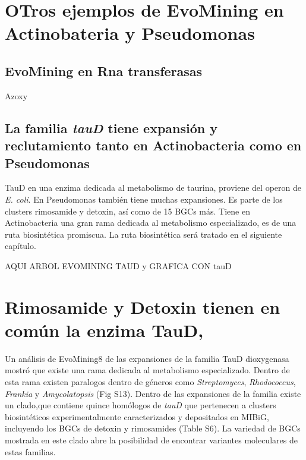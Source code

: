\documentclass[12pt,twoside]{reedthesis}
\begin{document}
  \section{OTros ejemplos de EvoMining en Actinobateria y
  Pseudomonas}\label{otros-ejemplos-de-evomining-en-actinobateria-y-pseudomonas}
  
  \subsection{EvoMining en Rna
  transferasas}\label{evomining-en-rna-transferasas}
  
  Azoxy
  
  \subsection{\texorpdfstring{La familia \emph{tauD} tiene expansión y
  reclutamiento tanto en Actinobacteria como en
  Pseudomonas}{La familia tauD tiene expansión y reclutamiento tanto en Actinobacteria como en Pseudomonas}}\label{la-familia-taud-tiene-expansion-y-reclutamiento-tanto-en-actinobacteria-como-en-pseudomonas}
  
  TauD en una enzima dedicada al metabolismo de taurina, proviene del
  operon de \emph{E. coli}. En Pseudomonas también tiene muchas
  expansiones. Es parte de los clusters rimosamide y detoxin, así como de
  15 BGCs más. Tiene en Actinobacteria una gran rama dedicada al
  metabolismo especializado, es de una ruta biosintética promiscua. La
  ruta biosintética será tratado en el siguiente capítulo.
  
  AQUI ARBOL EVOMINING TAUD y GRAFICA CON tauD
  
  \section{Rimosamide y Detoxin tienen en común la enzima
  TauD,}\label{rimosamide-y-detoxin-tienen-en-comun-la-enzima-taud}
  
  Un análisis de EvoMining8 de las expansiones de la familia TauD
  dioxygenasa mostró que existe una rama dedicada al metabolismo
  especializado. Dentro de esta rama existen paralogos dentro de géneros
  como \emph{Streptomyces}, \emph{Rhodococcus}, \emph{Frankia} y
  \emph{Amycolatopsis} (Fig S13). Dentro de las expansiones de la familia
  existe un clado,que contiene quince homólogos de \emph{tauD} que
  pertenecen a clusters biosintéticos experimentalmente caracterizados y
  depositados en MIBiG, incluyendo los BGCs de detoxin y rimosamides
  (Table S6). La variedad de BGCs mostrada en este clado abre la
  posibilidad de encontrar variantes moleculares de estas familias.
  
\end{document}
